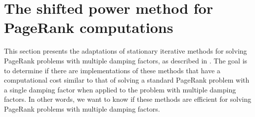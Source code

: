 
\section{The shifted power method for PageRank computations}
This section presents the adaptations of stationary iterative methods for solving PageRank problems with multiple damping factors, as described in \cite{SHEN2022126799}. The goal is to determine if there are implementations of these methods that have a computational cost similar to that of solving a standard PageRank problem with a single damping factor when applied to the problem with multiple damping factors. In other words, we want to know if these methods are efficient for solving PageRank problems with multiple damping factors.

